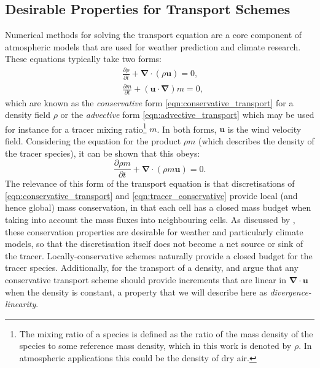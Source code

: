 \documentclass{ametsocV6.1}
\newcommand{\pfrac}[2]{\frac{\partial{#1}}{\partial{#2}}}
\begin{document}
\subsection{Desirable Properties for Transport Schemes}
Numerical methods for solving the transport equation are a core component of atmospheric models that are used for weather prediction and climate research.
These equations typically take two forms:
\begin{subequations}
\begin{align}
& \pfrac{\rho}{t} + \bm{\nabla\cdot}\left(\rho\bm{u}\right) = 0, \label{eqn:conservative_transport} \\
& \pfrac{m}{t} + \left(\bm{u\cdot\nabla}\right)m = 0, \label{eqn:advective_transport}
\end{align}
\end{subequations}
which are known as the \textit{conservative} form \eqref{eqn:conservative_transport} for a density field $\rho$ or the \textit{advective} form \eqref{eqn:advective_transport} which may be used for instance for a tracer mixing ratio\footnote{The mixing ratio of a species is defined as the ratio of the mass density of the species to some reference mass density, which in this work is denoted by $\rho$. In atmospheric applications this could be the density of dry air.} $m$. 
In both forms, $\bm{u}$ is the wind velocity field.
Considering the equation for the product $\rho m$ (which describes the density of the tracer species), it can be shown that this obeys:
\begin{equation}
\pfrac{\rho m}{t} + \bm{\nabla\cdot}\left(\rho m\bm{u}\right) = 0. \label{eqn:tracer_conservative}
\end{equation}
The relevance of this form of the transport equation is that discretisations of \eqref{eqn:conservative_transport} and \eqref{eqn:tracer_conservative} provide local (and hence global) mass conservation, in that each cell has a closed mass budget when taking into account the mass fluxes into neighbouring cells.
As discussed by \cite{thuburn2008some}, these conservation properties are desirable for weather and particularly climate models, so that the discretisation itself does not become a net source or sink of the tracer.
Locally-conservative schemes naturally provide a closed budget for the tracer species. 
Additionally, for the transport of a density, \citet{lin1996ffsl} and \citet{melvin2024mixed} argue that any conservative transport scheme should provide increments that are linear in $\bm{\nabla\cdot u}$ when the density is constant, a property that we will describe here as \textit{divergence-linearity}.
\end{document}
